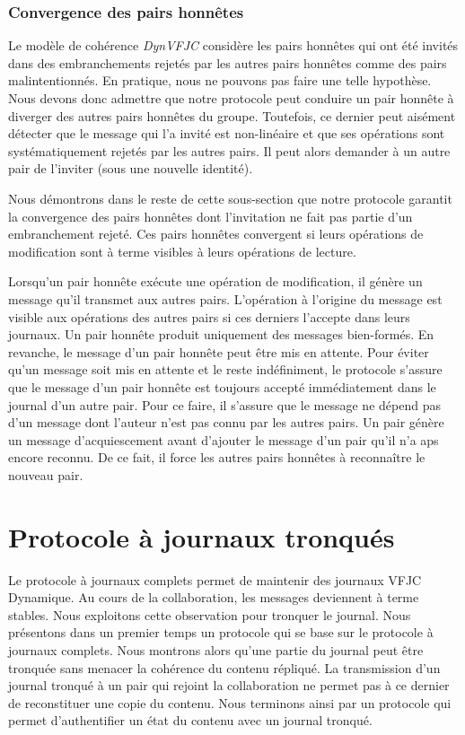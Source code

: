 \subsubsection{Convergence des pairs honnêtes}

Le modèle de cohérence \emph{DynVFJC} considère les pairs honnêtes qui ont été invités dans des embranchements rejetés par les autres pairs honnêtes comme des pairs malintentionnés.
En pratique, nous ne pouvons pas faire une telle hypothèse.
Nous devons donc admettre que notre protocole peut conduire un pair honnête à diverger des autres pairs honnêtes du groupe.
Toutefois, ce dernier peut aisément détecter que le message qui l'a invité est non-linéaire et que ses opérations sont systématiquement rejetés par les autres pairs.
Il peut alors demander à un autre pair de l'inviter (sous une nouvelle identité).

Nous démontrons dans le reste de cette sous-section que notre protocole garantit la convergence des pairs honnêtes dont l'invitation ne fait pas partie d'un embranchement rejeté.
Ces pairs honnêtes convergent si leurs opérations de modification sont à terme visibles à leurs opérations de lecture.

Lorsqu'un pair honnête exécute une opération de modification, il génère un message qu'il transmet aux autres pairs.
L'opération à l'origine du message est visible aux opérations des autres pairs si ces derniers l'accepte dans leurs journaux.
Un pair honnête produit uniquement des messages bien-formés.
En revanche, le message d'un pair honnête peut être mis en attente.
Pour éviter qu'un message soit mis en attente et le reste indéfiniment, le protocole s'assure que le message d'un pair honnête est toujours accepté immédiatement dans le journal d'un autre pair.
Pour ce faire, il s'assure que le message ne dépend pas d'un message dont l'auteur n'est pas connu par les autres pairs.
Un pair génère un message d'acquiescement avant d'ajouter le message d'un pair qu'il n'a aps encore reconnu.
De ce fait, il force les autres pairs honnêtes à reconnaître le nouveau pair.

\clearpage

\section{Protocole à journaux tronqués}\label{sec:pruned-log-protocol}

Le protocole à journaux complets permet de maintenir des journaux \acl{VFJC} Dynamique.
Au cours de la collaboration, les messages deviennent à terme stables.
Nous exploitons cette observation pour tronquer le journal.
Nous présentons dans un premier temps un protocole qui se base sur le protocole à journaux complets.
Nous montrons alors qu'une partie du journal peut être tronquée sans menacer la cohérence du contenu répliqué.
La transmission d'un journal tronqué à un pair qui rejoint la collaboration ne permet pas à ce dernier de reconstituer une copie du contenu.
Nous terminons ainsi par un protocole qui permet d'authentifier un état du contenu avec un journal tronqué.


